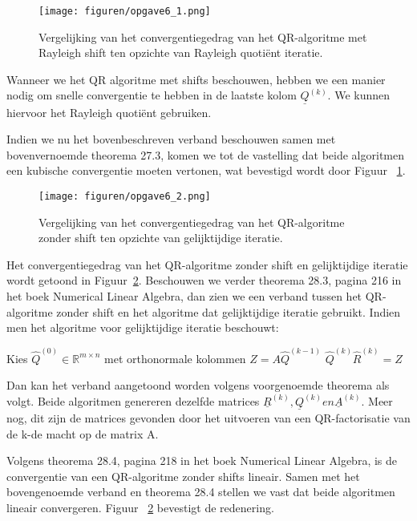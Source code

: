 \documentclass[a4paper, 12pt, titlepage]{report}
\begin{document}
\begin{figure}[htb]
	\centering
	\texttt{[image: figuren/opgave6\_1.png]}
	\caption{Vergelijking van het convergentiegedrag van het QR-algoritme met Rayleigh shift ten opzichte van Rayleigh quoti\"ent iteratie.}
	\label{fig:opgave6_1}
\end{figure}

Wanneer we het QR algoritme met shifts beschouwen, hebben we een manier nodig om snelle convergentie te hebben in de laatste kolom $\underline{Q}^{(k)}$. We kunnen hiervoor het Rayleigh quoti\"ent gebruiken.

Indien we nu het bovenbeschreven verband beschouwen samen met bovenvernoemde theorema 27.3, komen we tot de vastelling dat beide algoritmen een kubische convergentie moeten vertonen, wat bevestigd wordt door Figuur ~\ref{fig:opgave6_1}.

\begin{figure}[htb]
	\centering
	\texttt{[image: figuren/opgave6\_2.png]}
	\caption{Vergelijking van het convergentiegedrag van het QR-algoritme zonder shift ten opzichte van gelijktijdige iteratie.}
	\label{fig:opgave6_2}
\end{figure}

Het convergentiegedrag van het QR-algoritme zonder shift en gelijktijdige iteratie wordt getoond in Figuur~\ref{fig:opgave6_2}. Beschouwen we verder theorema 28.3, pagina 216 in het boek Numerical Linear Algebra, dan zien we een verband tussen het QR-algoritme zonder shift en het algoritme dat gelijktijdige iteratie gebruikt. Indien men het algoritme voor gelijktijdige iteratie beschouwt:\\ 

\begin{algorithmic}
 \STATE Kies $\hat{Q}^{(0)}\in \mathbb{R}^{m\times n}$ met orthonormale kolommen
 	\STATE $Z = A\hat{Q}^{(k-1)}$
 	\STATE $\hat{Q}^{(k)}\hat{R}^{(k)} = Z$
 \ENDFOR
\end{algorithmic}

Dan kan het verband aangetoond worden volgens voorgenoemde theorema als volgt. Beide algoritmen genereren dezelfde matrices $\underline{R}^{(k)},\underline{Q}^{(k)} en \underline{A}^{(k)}$. Meer nog, dit zijn de matrices gevonden door het uitvoeren van een QR-factorisatie van de k-de macht op de matrix A.

Volgens theorema 28.4, pagina 218 in het boek Numerical Linear Algebra, is de convergentie van een QR-algoritme zonder shifts lineair. Samen met het bovengenoemde verband en theorema 28.4 stellen we vast dat beide algoritmen lineair convergeren. Figuur ~\ref{fig:opgave6_2} bevestigt de redenering.
\end{document}
